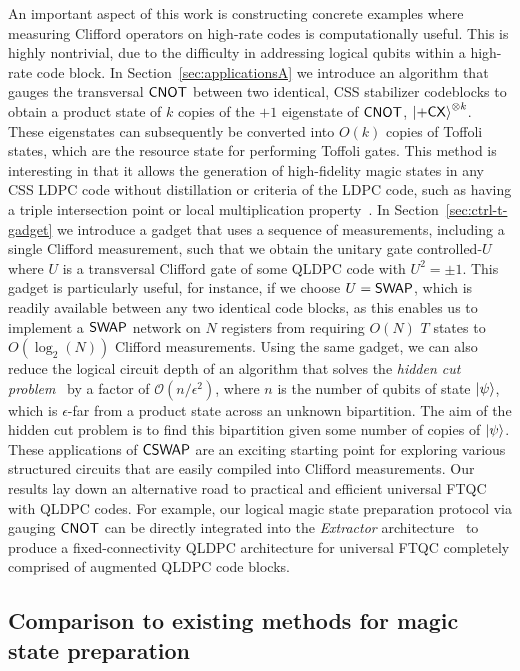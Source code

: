 \documentclass[11pt]{article}
\begin{document}
An important aspect of this work is constructing concrete examples where measuring Clifford operators on high-rate codes is computationally useful. This is highly nontrivial, due to the difficulty in addressing logical qubits within a high-rate code block. 
In Section~\ref{sec:applicationsA} we introduce an algorithm that gauges the transversal $\mathsf{CNOT}$ between two identical, CSS stabilizer codeblocks to obtain a product state of $k$ copies of the $+1$ eigenstate of $\mathsf{CNOT}$, $\ket{+\mathsf{CX}}^{\otimes k}$.
These eigenstates can subsequently be converted into $O(k)$ copies of Toffoli states, which are the resource state for performing Toffoli gates.
This method is interesting in that it allows the generation of high-fidelity magic states in any CSS LDPC code without distillation or criteria of the LDPC code, such as having a triple intersection point or local multiplication property~\cite{Zhu_2025}.
In Section~\ref{sec:ctrl-t-gadget} we introduce a gadget that uses a sequence of measurements, including a single Clifford measurement, such that we obtain the unitary gate controlled-$U$ where $U$ is a transversal Clifford gate of some QLDPC code with $U^2=\pm 1 $. This gadget is particularly useful, for instance, if we choose $U=\mathsf{SWAP}$, which is readily available between any two identical code blocks, as this enables us to implement a $\mathsf{SWAP}$ network on $N$ registers from requiring $O(N)$ $T$ states to $O(\log_2(N))$ Clifford measurements. 
Using the same gadget, we can also reduce the logical circuit depth of an algorithm that solves the \textit{hidden cut problem}~\cite{bouland2024statehiddensubgroupproblem} by a factor of $\mathcal{O}(n/\epsilon^2)$, where $n$ is the number of qubits of state $\ket{\psi}$, which is $\epsilon$-far from a product state across an unknown bipartition. 
The aim of the hidden cut problem is to find this bipartition given some number of copies of $\ket{\psi}$.
These applications of $\mathsf{CSWAP}$ are an exciting starting point for exploring various structured circuits that are easily compiled into Clifford measurements.
Our results lay down an alternative road to practical and efficient universal FTQC with QLDPC codes. 
For example, our logical magic state preparation protocol via gauging $\mathsf{CNOT}$ can be directly integrated into the \textit{Extractor} architecture~\cite{he2025extractorsqldpcarchitecturesefficient} to produce a fixed-connectivity QLDPC architecture for universal FTQC completely comprised of augmented QLDPC code blocks. 



\subsection{Comparison to existing methods for magic state preparation}
\end{document}
